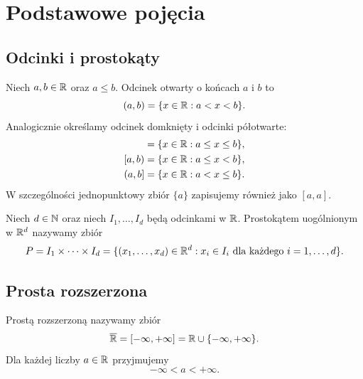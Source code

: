 \setcounter{chapter}{-1}
\chapter{Podstawowe pojęcia}
\label{chap:podstawowe-pojecia}

\section{Odcinki i prostokąty}
\label{sec:terminologia}

\begin{definicja}[Odcinki]
Niech $a,b\in\mathbb{R}$ oraz $a\leq b$. Odcinek otwarty o końcach $a$ i $b$ to
\begin{equation}
  (a,b)=\{x\in\mathbb{R}:a<x<b\}.
  \label{eq:odcinek-otwarty}
\end{equation}
Analogicznie określamy odcinek domknięty i odcinki półotwarte:
\begin{align*}
  [a,b]&=\{x\in\R:a\leq x\leq b\},\\
  [a,b)&=\{x\in\R:a\leq x<b\},\\
  (a,b]&=\{x\in\R:a<x\leq b\}.
\end{align*}
W szczególności jednopunktowy zbiór $\{a\}$ zapisujemy również jako $[a,a]$.
\end{definicja}

\begin{definicja}
Niech $d\in\mathbb{N}$ oraz niech $I_1,\ldots,I_d$ będą odcinkami w $\mathbb{R}$.
Prostokątem uogólnionym w $\mathbb{R}^d$ nazywamy zbiór
\begin{equation}
  P=I_1\times\cdots\times I_d
   =\{(x_1,\ldots,x_d)\in\mathbb{R}^d:
       x_i\in I_i\text{ dla każdego }i=1,\ldots,d\}.
  \label{eq:prostokat}
\end{equation}
\end{definicja}

\section{Prosta rozszerzona}
\label{sec:prosta-rozszerzona}

\begin{definicja}
Prostą rozszerzoną nazywamy zbiór
\begin{equation}
  \overline{\mathbb{R}}=[-\infty,+\infty]=\mathbb{R}\cup\{-\infty,+\infty\}.
  \label{eq:prosta-rozszerzona}
\end{equation}
Dla każdej liczby $a\in\mathbb{R}$ przyjmujemy
\[
  -\infty<a<+\infty.
\]
\end{definicja}

